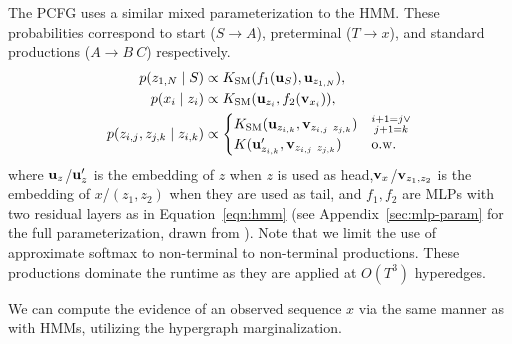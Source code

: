 \documentclass{article}
\begin{document}
The PCFG uses a similar mixed parameterization to the HMM. These probabilities correspond to start ($S\to A$), preterminal ($T\to x$), and standard productions ($A\to B\ C$) respectively.
\begin{equation}
\label{eqn:pcfg}
\begin{aligned}
p(z_{1,N} \mid S ) &\propto K_{\mathrm{SM}}(f_1(\mathbf{u}_{S}), \mathbf{u}_{z_{1,N}}),\\
p(x_i \mid z_i) &\propto K_{\mathrm{SM}}(\mathbf{u}_{z_i}, f_2(\mathbf{v}_{x_i})),\\
p( z_{i,j}, z_{j,k} \mid z_{i,k}) &\propto \begin{cases}
  K_{\mathrm{SM}}(\mathbf{u}_{z_{i,k}}, \mathbf{v}_{z_{i,j}\ z_{j,k}}) & \substack{i+1 = j \lor \\j+1=k} \\ 
 K(\mathbf{u}_{z_{i,k}}', \mathbf{v}_{z_{i,j}\ z_{j,k}}) &\text{o.w.} \\
\end{cases}\\
\end{aligned}
\end{equation}
where $\mathbf{u}_{z}$/$\mathbf{u}_z'$ is the embedding of $z$ when $z$ is used as head,$\mathbf{v}_{x}$/$\mathbf{v}_{z_1, z_2}$ is the embedding of $x$/$(z_1, z_2)$ when they are used as tail, and $f_1, f_2$ are MLPs with two residual layers as in
Equation~\ref{eqn:hmm} (see Appendix~\ref{sec:mlp-param} for the full
parameterization, drawn from \citet{kim2019cpcfg}). Note that we limit
the use of approximate softmax to non-terminal to non-terminal
productions. These productions dominate the runtime as they
are applied at $O(T^3)$ hyperedges.

We can compute the evidence of an observed sequence $x$ via the same
manner as with HMMs, utilizing the hypergraph marginalization.




\end{document}

